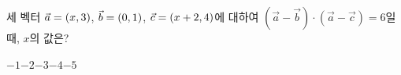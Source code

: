 세 벡터 $\vec{a}=(x{,}\mkern3mu\mathopen{}3)$, $\vec{b}=(0{,}\mkern3mu\mathopen{}1)$, $\vec{c}=(x+2{,}\mkern3mu\mathopen{}4)$에 대하여 $(\vec{a}-\vec{b})\cdot(\vec{a}-\vec{c})=6$일 때, $x$의 값은?
\begin{choices32}{$-1$}{$-2$}{$-3$}{$-4$}{$-5$}\end{choices32}
